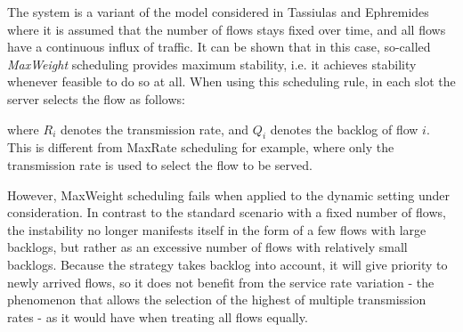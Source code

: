 \documentclass[a4paper,11pt]{article}
\begin{document}
\begin{slidetop}
\begin{multicols}{2}
 

\bigskip

The system is a variant of the model considered in Tassiulas and Ephremides~\cite{TE93}\, where it is assumed that the number of flows stays fixed over time, and all flows have a continuous influx of traffic. It can be shown that in this case, so-called {\em MaxWeight} scheduling provides maximum stability, i.e. it achieves stability whenever feasible to do so at all. When using this scheduling rule, in each slot the server selects the flow as follows:

\bigskip 

where $R_i$ denotes the transmission rate, and $Q_i$ denotes the backlog of flow $i$. This is different from MaxRate scheduling for example, where only the transmission rate is used to select the flow to be served.

However, MaxWeight scheduling fails when applied to the dynamic setting under consideration. In contrast to the standard scenario with a fixed number of flows, the instability no longer manifests itself in the form of a few flows with large backlogs, but rather as an excessive number of flows with relatively small backlogs. Because the strategy takes backlog into account, it will give priority to newly arrived flows, so it does not benefit from the service rate variation - the phenomenon that allows the selection of the highest of multiple transmission rates - as it would have when treating all flows equally.


\end{multicols}
\end{slidetop}
\end{document}
